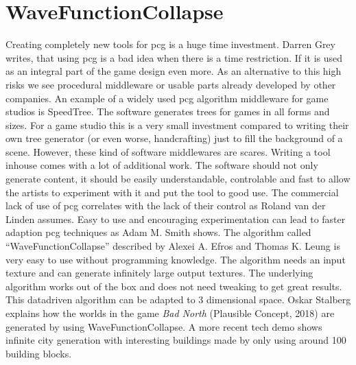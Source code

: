 \documentclass[10pt,a4paper]{article}
\begin{document}
\section{WaveFunctionCollapse}
\begin{multicols}{2}
Creating completely new tools for \gls{pcg} is a huge time investment. Darren Grey writes, that using \gls{pcg} is a bad idea when there is a time restriction\citep[p.~6]{Short:2017:PGG:3161477}. If it is used as an integral part of the game design even more. As an alternative to this high risks we see procedural middleware or usable parts already developed by other companies. An example of a widely used \gls{pcg} algorithm middleware for game studios is SpeedTree\cite{SpeedTree}. The software generates trees for games in all forms and sizes. For a game studio this is a very small investment compared to writing their own tree generator (or even worse, handcrafting) just to fill the background of a scene. However, these kind of software middlewares are scares. Writing a tool inhouse comes with a lot of additional work. The software should not only generate content, it should be easily understandable, controlable and fast to allow the artists to experiment with it and put the tool to good use. The commercial lack of use of \gls{pcg} correlates with the lack of their control as Roland van der Linden assumes\cite{VanderLinden2014}. Easy to use and encouraging experimentation can lead to faster adaption \gls{pcg} techniques as Adam M. Smith shows\cite{Karth2017}. The algorithm called “WaveFunctionCollapse” described by Alexei A. Efros and Thomas K. Leung is very easy to use without programming knowledge\cite{Efros1999}. The algorithm needs an input texture and can generate infinitely large output textures. The underlying algorithm works out of the box and does not need tweaking to get great results. This datadriven algorithm can be adapted to 3 dimensional space. Oskar Stalberg explains how the worlds in the game \textit{Bad North} (Plausible Concept, 2018) are generated by using WaveFunctionCollapse. A more recent tech demo shows infinite city generation with interesting buildings made by only using around 100 building blocks\cite{Marian2019}.
\end{multicols}
\end{document}
